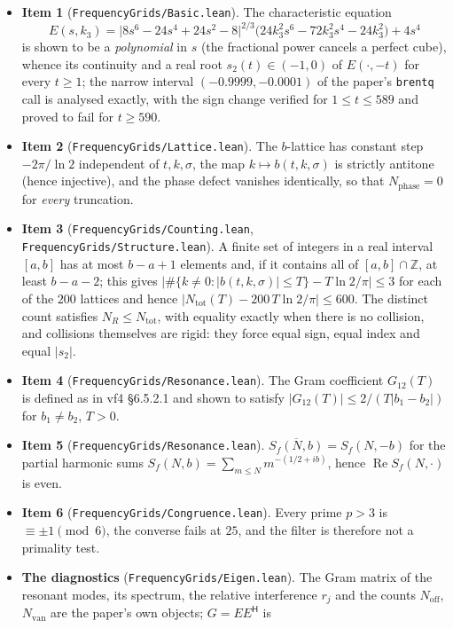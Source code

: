 \documentclass[11pt,a4paper]{article}
\newcommand{\Z}{\mathbb{Z}}
\newcommand{\code}[1]{\texttt{#1}}
\newcommand{\itemization}[1]{\begin{itemize}[leftmargin=1.4em,itemsep=1pt,topsep=2pt]#1\end{itemize}}
\theoremstyle{definition}
\theoremstyle{remark}
\begin{document}
\itemization{
\item \textbf{Item 1} (\code{FrequencyGrids/Basic.lean}). The characteristic equation
  \[
    E(s,k_3)=\bigl|8s^6-24s^4+24s^2-8\bigr|^{2/3}\bigl(24k_3^2s^6-72k_3^2s^4-24k_3^2\bigr)+4s^4
  \]
  is shown to be a \emph{polynomial} in $s$ (the fractional power cancels a perfect cube),
  whence its continuity and a real root $s_2(t)\in(-1,0)$ of $E(\cdot,-t)$ for every $t\ge1$;
  the narrow interval $(-0.9999,-0.0001)$ of the paper's \code{brentq} call is analysed
  exactly, with the sign change verified for $1\le t\le589$ and proved to fail for
  $t\ge590$.
\item \textbf{Item 2} (\code{FrequencyGrids/Lattice.lean}). The $b$-lattice has constant step
  $-2\pi/\ln2$ independent of $t,k,\sigma$, the map $k\mapsto b(t,k,\sigma)$ is strictly
  antitone (hence injective), and the phase defect vanishes identically, so that
  $N_{\mathrm{phase}}=0$ for \emph{every} truncation.
\item \textbf{Item 3} (\code{FrequencyGrids/Counting.lean},
  \code{FrequencyGrids/Structure.lean}). A finite set of integers in a real interval
  $[a,b]$ has at most $b-a+1$ elements and, if it contains all of $[a,b]\cap\Z$, at least
  $b-a-2$; this gives
  $\bigl|\#\{k\neq0:|b(t,k,\sigma)|\le T\}-T\ln2/\pi\bigr|\le3$ for each of the $200$
  lattices and hence $\bigl|N_{\mathrm{tot}}(T)-200\,T\ln2/\pi\bigr|\le600$.  The distinct
  count satisfies $N_R\le N_{\mathrm{tot}}$, with equality exactly when there is no
  collision, and collisions themselves are rigid: they force equal sign, equal index and
  equal $|s_2|$.
\item \textbf{Item 4} (\code{FrequencyGrids/Resonance.lean}). The Gram coefficient
  $G_{12}(T)$ is defined as in vf4 \S6.5.2.1 and shown to satisfy
  $|G_{12}(T)|\le2/(T|b_1-b_2|)$ for $b_1\neq b_2$, $T>0$.
\item \textbf{Item 5} (\code{FrequencyGrids/Resonance.lean}). $\overline{S_f(N,b)}=S_f(N,-b)$
  for the partial harmonic sums $S_f(N,b)=\sum_{m\le N}m^{-(1/2+ib)}$, hence
  $\operatorname{Re}S_f(N,\cdot)$ is even.
\item \textbf{Item 6} (\code{FrequencyGrids/Congruence.lean}). Every prime $p>3$ is
  $\equiv\pm1\pmod 6$, the converse fails at $25$, and the filter is therefore not a
  primality test.
\item \textbf{The diagnostics} (\code{FrequencyGrids/Eigen.lean}). The Gram matrix of the
  resonant modes, its spectrum, the relative interference $r_j$ and the counts
  $N_{\mathrm{off}}$, $N_{\mathrm{van}}$ are the paper's own objects; $G=E E^{\mathsf H}$ is
}
\end{document}
